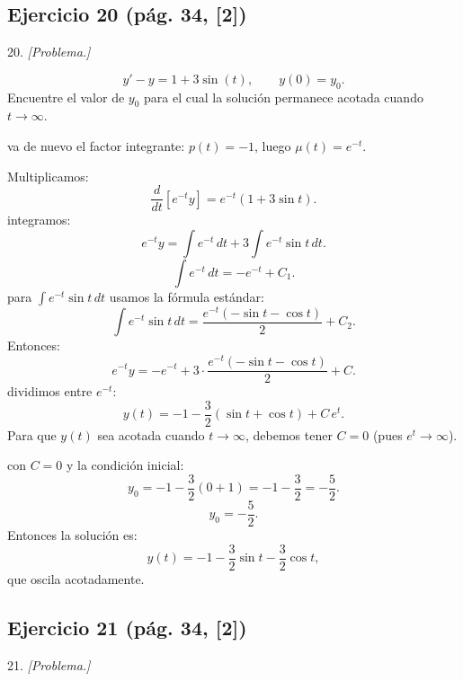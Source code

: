 \subsection*{Ejercicio 20 \quad\normalfont\small(pág. 34, [2])}

\begin{enunciado}{20.}
    \textit{[Problema.]}
\end{enunciado}

\begin{respuesta}
\[
  y' - y = 1 + 3\sin(t), \qquad y(0) = y_0.
\]
Encuentre el valor de $y_0$ para el cual la soluci\'on permanece acotada
cuando $t \to \infty$.

va de nuevo el factor integrante: $p(t) = -1$, luego $\mu(t) = e^{-t}$.

Multiplicamos:
\[
  \frac{d}{dt}\!\left[e^{-t}y\right] = e^{-t}(1 + 3\sin t).
\]
integramos:
\[
  e^{-t}y = \int e^{-t}\,dt + 3\int e^{-t}\sin t\,dt.
\]
\[
  \int e^{-t}\,dt = -e^{-t} + C_1.
\]
para $\int e^{-t}\sin t\,dt$ usamos la f\'ormula est\'andar:
\[
  \int e^{-t}\sin t\,dt = \frac{e^{-t}(-\sin t - \cos t)}{2} + C_2.
\]
Entonces:
\[
  e^{-t}y = -e^{-t} + 3\cdot\frac{e^{-t}(-\sin t - \cos t)}{2} + C.
\]
dividimos entre $e^{-t}$:
\[
  y(t) = -1 - \frac{3}{2}(\sin t + \cos t) + C\,e^{t}.
\]
Para que $y(t)$ sea acotada cuando $t\to\infty$, debemos tener $C = 0$
(pues $e^t \to \infty$).

con $C = 0$ y la condici\'on inicial:
\[
  y_0 = -1 - \frac{3}{2}(0 + 1) = -1 - \frac{3}{2} = -\frac{5}{2}.
\]
\[
  \boxed{y_0 = -\frac{5}{2}.}
\]
Entonces la solución es:
\[
  y(t) = -1 - \frac{3}{2}\sin t - \frac{3}{2}\cos t,
\]
que oscila acotadamente.
    \vspace{7cm}
\end{respuesta}

\subsection*{Ejercicio 21 \quad\normalfont\small(pág. 34, [2])}

\begin{enunciado}{21.}
    \textit{[Problema.]}
\end{enunciado}

